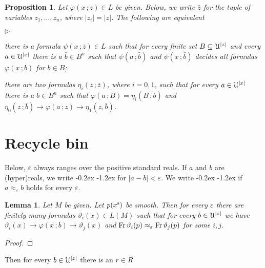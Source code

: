 \documentclass[10pt,openany]{article}
\newcommand{\mylabel}[1]{{\ssf{#1}}\hfill}
\renewenvironment{itemize}
  {\begin{list}{$\triangleright$}{%
   \setlength{\parskip}{0mm}
   \setlength{\topsep}{.4\baselineskip}
   \setlength{\rightmargin}{0mm}
   \setlength{\listparindent}{0mm}
   \setlength{\itemindent}{0mm}
   \setlength{\labelwidth}{3ex}
   \setlength{\itemsep}{.4\baselineskip}
   \setlength{\parsep}{0mm}
   \setlength{\partopsep}{0mm}
   \setlength{\labelsep}{1ex}
   \setlength{\leftmargin}{\labelwidth+\labelsep}
   \let\makelabel\mylabel}}{%
   \end{list}\vspace*{-\parskip}
  }
\def\Fr{\mathop{\rm Fr}}
\def\imp{\rightarrow}
\def\U{\EuScript U}
\def\theta{\vartheta}
\def\phi{\varphi}
\def\epsilon{\varepsilon}
\def\ssf#1{\textsf{\small #1}}
\newcounter{thm}[section]
\theoremstyle{mio}
\newtheorem{proposition}[thm]{Proposition}
\newtheorem{lemma}[thm]{Lemma}
\theoremstyle{liscio}
\renewcommand*{\emph}[1]{%
   \kern-0.2ex 
   \smash{\tikz[baseline]
   \node[ rectangle, fill=emphcolor, rounded corners, 
          inner xsep=.3ex, inner ysep=.2ex, anchor=base,
          minimum height = 3ex
         ]{#1};
   }
   \kern-1.2ex 
}
\begin{document}
\begin{proposition} 
  Let $\phi(x\,;z)\in L$ be given.
  Below, we write $\bar z$ for the tuple of variables $z_1,\dots,z_n$, where $|z_i|=|z|$.
  The following are equivalent
   \begin{itemize}
    \item[1.] there is a formula $\psi(x\,;\bar z)\in L$ such that for every finite set $B\subseteq\U^{|z|}$ and every $a\in\U^{|x|}$ there is a $\bar b\in B^n$ such that $\psi(a\,;\bar b)$ and $\psi(x\,;\bar b)$ decides all formulas $\phi(x\,; b)$ for $b\in B$;
    \item[2.] there are two formulas $\eta_i(z\,;\bar z)$, where $i=0,1$, such that for every $a\in\U^{|x|}$ there is a $\bar b\in B^n$ such that $\phi(a\,;B)=\eta_i(B\,;\bar b)$ and $\eta_0(z\,;\bar b)\imp\phi(a\,;z)\imp\eta_1(z,\bar b)$.
  \end{itemize}
\end{proposition}
\section{Recycle bin}

Below, $\epsilon$ always ranges over the positive standard reals.
%
If $a$ and $b$ are (hyper)reals, we write \emph{$a\approx_\epsilon b$\/} for $|a-b|<\epsilon$.
%
We write \emph{$a\approx b$\/} if $a\approx_\epsilon b$ holds for every $\epsilon$.


\begin{lemma}
  Let $M$ be given.
  Let $p(x^{\rm s})$ be smooth.
  Then for every $\epsilon$ there are finitely many formulas $\theta_i(x)\in L(M)$ such that for every $b\in\U^{|z|}$ we have $\theta_i(x)\imp\phi(x\,;b)\imp\theta_j(x)$ and $\Fr\theta_i(p)\approx_\epsilon\Fr\theta_j(p)$ for some $i,j$.
\end{lemma}

\begin{proof}


\end{proof}
%
Then for every $b\in\U^{|z|}$ there is an $r\in R$
\end{document}
